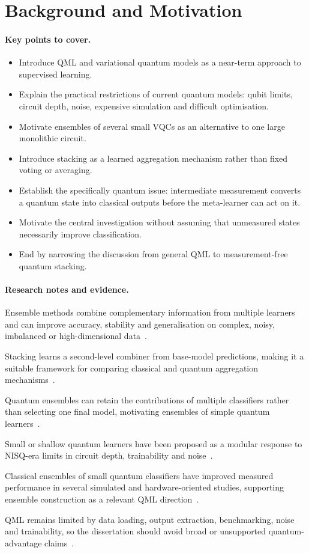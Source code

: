 \documentclass[]{UCD_CS_MSc_AAI_Report}
\newcommand{\motive}[1]{{\color{blue!70!cyan}#1}}
\newcommand{\challenge}[1]{{\color{red}#1}}
\newcommand{\sectionbrief}{\paragraph{Key points to cover.}}
\newcommand{\researchnotes}{\paragraph{Research notes and evidence.}}
\begin{document}
\section{Background and Motivation}
\label{sec:intro-background}

\sectionbrief
\begin{itemize}
    \item Introduce QML and variational quantum models as a near-term approach to supervised learning.
    \item Explain the practical restrictions of current quantum models: qubit limits, circuit depth, noise, expensive simulation and difficult optimisation.
    \item Motivate ensembles of several small VQCs as an alternative to one large monolithic circuit.
    \item Introduce stacking as a learned aggregation mechanism rather than fixed voting or averaging.
    \item Establish the specifically quantum issue: intermediate measurement converts a quantum state into classical outputs before the meta-learner can act on it.
    \item Motivate the central investigation without assuming that unmeasured states necessarily improve classification.
    \item End by narrowing the discussion from general QML to measurement-free quantum stacking.
\end{itemize}

\researchnotes
\begin{itemize}
    \motive{\item Ensemble methods combine complementary information from multiple learners and can improve accuracy, stability and generalisation on complex, noisy, imbalanced or high-dimensional data~\cite{dong_survey_2020}.}
    \motive{\item Stacking learns a second-level combiner from base-model predictions, making it a suitable framework for comparing classical and quantum aggregation mechanisms~\cite{demir_modified_2018}.}
    \motive{\item Quantum ensembles can retain the contributions of multiple classifiers rather than selecting one final model, motivating ensembles of simple quantum learners~\cite{schuld_quantum_2018}.}
    \motive{\item Small or shallow quantum learners have been proposed as a modular response to NISQ-era limits in circuit depth, trainability and noise~\cite{friedrich_quantum_2025,park_addressing_2025,incudini_resource_2023}.}
    \motive{\item Classical ensembles of small quantum classifiers have improved measured performance in several simulated and hardware-oriented studies, supporting ensemble construction as a relevant QML direction~\cite{song_quantum_2024,mcfarthing_classical_2024,tolotti_ensembles_2024}.}
    \challenge{\item QML remains limited by data loading, output extraction, benchmarking, noise and trainability, so the dissertation should avoid broad or unsupported quantum-advantage claims~\cite{biamonte_quantum_2017,du_quantum_2025}.}
\end{itemize}
\end{document}
